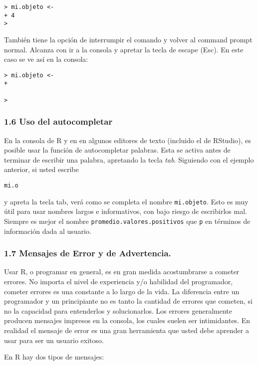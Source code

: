 \documentclass[]{article}
\begin{document}
\begin{verbatim}
> mi.objeto <-
+ 4
>
\end{verbatim}
También tiene la opción de interrumpir el comando y volver al command
prompt normal. Alcanza con ir a la consola y apretar la tecla de escape
(Esc). En este caso se ve así en la consola:

\begin{verbatim}
> mi.objeto <-
+ 

>
\end{verbatim}
\subsubsection{1.6 Uso del autocompletar}

En la consola de R y en en algunos editores de texto (incluido el de
RStudio), es posible usar la función de autocompletar palabras. Esta se
activa antes de terminar de escribir una palabra, apretando la tecla
\emph{tab}. Siguiendo con el ejemplo anterior, si usted escribe

\begin{verbatim}
mi.o
\end{verbatim}
y apreta la tecla tab, verá como se completa el nombre
\texttt{mi.objeto}. Esto es muy útil para usar nombres largos e
informativos, con bajo riesgo de escribirlos mal. Siempre es mejor el
nombre \texttt{promedio.valores.positivos} que \texttt{p} en términos de
información dada al usuario.

\subsubsection{1.7 Mensajes de Error y de Advertencia.}

Usar R, o programar en general, es en gran medida acostumbrarse a
cometer errores. No importa el nivel de experiencia y/o habilidad del
programador, cometer errores es una constante a lo largo de la vida. La
diferencia entre un programador y un principiante no es tanto la
cantidad de errores que cometen, si no la capacidad para entenderlos y
solucionarlos. Los errores generalmente producen mensajes impresos en la
consola, los cuales suelen ser intimidantes. En realidad el mensaje de
error es una gran herramienta que usted debe aprender a usar para ser un
usuario exitoso.

En R hay dos tipos de mensajes:
\end{document}
